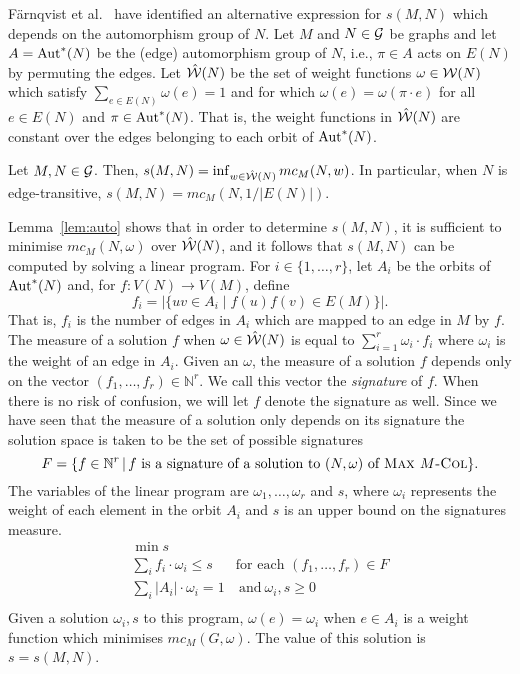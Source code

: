 \documentclass[11pt,a4paper]{article}
\begin{document}
F\"arnqvist et al.~\cite{farnqvist:etal:09} have identified 
an alternative expression for $s(M,N)$
which depends on the automorphism group of $N$.
Let $M$ and $N \in {\cal G}$ be graphs and let $A = \mbox{\rm Aut}^*(N)$ be the
(edge) automorphism group of $N$, i.e., $\pi \in A$ acts on $E(N)$
by permuting the edges.
Let $\hat{{\cal W}}(N)$ be the set of
weight functions $\omega \in {\cal W}(N)$ which satisfy 
$\sum_{e \in E(N)} \omega(e) = 1$
and for which $\omega(e) = \omega(\pi \cdot e)$ for all $e \in E(N)$ and
$\pi \in \mbox{\rm Aut}^*(N)$. That is, the weight functions in $\hat{{\cal W}}(N)$
are constant over the edges belonging to each orbit of $\mbox{\rm Aut}^*(N)$.
\begin{lemma}
\label{lem:auto}
   Let $M,N\in {\cal G}$.
    Then,
    $s(M,N) = \inf_{w \in {\cal {\hat W}}(N)} mc_M(N,w)$.
    In particular, when $N$ is edge-transitive,
    $s(M,N) = mc_M(N,1/|E(N)|)$.
\end{lemma}
Lemma~\ref{lem:auto} shows that in order to determine $s(M,N)$, it is
sufficient to minimise $mc_M(N,\omega)$ over $\hat{{\cal W}}(N)$, and it follows
that $s(M,N)$ can be computed by solving a linear program.
For $i \in \{1,\ldots,r\}$, let $A_i$ be the orbits
of $\mbox{\rm Aut}^*(N)$ and, for $f : V(N) \rightarrow V(M)$, define
\begin{equation}
f_i = | \{u v \in A_i \;|\; f(u) f(v) \in E(M)\}|.
\end{equation}
That is, $f_i$ is the number of edges in $A_i$ which are mapped to an
edge in $M$ by $f$. The measure of a solution $f$ when $\omega \in
\hat{{\cal W}}(N)$ is equal to $\sum_{i=1}^{r}{\omega_i \cdot f_i}$
where $\omega_i$ is the weight of an edge in $A_i$. Given an $\omega$,
the measure of a solution $f$ depends only on the vector
$(f_1,\ldots,f_r) \in {\mathbb N}^r$. We call this vector the {\em
signature} of $f$. When there is no risk of confusion,
we will let $f$ denote the signature as well.
Since we have seen that the measure of a solution only
depends on its signature the solution space is taken to be the set of
possible signatures  
\begin{equation}
F = \{f \in {\mathbb N}^r \,|\, f\mbox{ is a signature of a solution to $(N,\omega)$ of
$\mbox{\sc Max $M$-Col}$} \}.
\end{equation}
The variables of the linear program are $\omega_1,\ldots,\omega_r$ and
$s$, where $\omega_i$ represents the weight of each element in the orbit
$A_i$ and $s$ is an upper bound on the signatures measure.
\begin{equation*}
\tag{LP}
\label{lp}
\begin{array}{ll}
    \min s \\
    \sum_i f_i \cdot \omega_i \leq s & \text{for each $(f_1, \ldots, f_r) \in
F$} \\
    \sum_i |A_i| \cdot \omega_i = 1 & \ \text{and} \ \omega_i, s \geq 0\\
\end{array}
\end{equation*}
Given a solution $\omega_i,s$ to this program, $\omega(e) = \omega_i$
when $e \in A_i$ is a weight function which minimises $mc_M(G,\omega)$.
The value of this solution is $s = s(M,N)$. 
\end{document}

